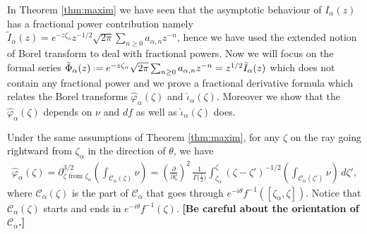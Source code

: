 \documentclass[11pt,a4paper,twoside,leqno,noamsfonts]{amsart}
\numberwithin{equation}{section}
\begin{document}
In Theorem \ref{thm:maxim} we have seen that the asymptotic behaviour of $I_\alpha(z)$ has a fractional power contribution namely $\tilde{I}_{\alpha}(z)=e^{-z\zeta_\alpha}z^{-1/2}\sqrt{2\pi}\sum_{n\geq 0}a_{\alpha,n}z^{-n}$, hence we have used the extended notion of Borel transform to deal with fractional powers. Now we will focus on the formal series $\tilde{\Phi}_\alpha(z)\defeq e^{-z\zeta_\alpha}\sqrt{2\pi}\sum_{n\geq 0}a_{\alpha,n}z^{-n}=z^{1/2}\tilde{I}_\alpha(z)$ which does not contain any fractional power and we prove a fractional derivative formula which relates the Borel transforms $\hat{\varphi}_\alpha(\zeta)$ and $\hat{\iota}_{\alpha}(\zeta)$. Moreover we show that the $\hat{\varphi}_{\alpha}(\zeta)$ depends on $\nu$ and $df$ as well as $\hat{\iota}_{\alpha}(\zeta)$ does. 

\begin{corollary}\label{int:deriv-formula} 
Under the same assumptions of Theorem \ref{thm:maxim}, for any $\zeta$ on the ray going rightward from $\zeta_\alpha$ in the direction of $\theta$, we have
\begin{multline}\label{formula1}
\hat{\varphi}_{\alpha}(\zeta)=\partial^{3/2}_{\zeta \text{ from }\zeta_\alpha} \left( \int_{\mathcal{C}_\alpha(\zeta)}\nu \right)={\left(\tfrac{\partial}{\partial \zeta}\right)^2}\,\frac{1}{\Gamma\big(\tfrac{1}{2}\big)} \int_{\zeta_\alpha}^\zeta (\zeta-\zeta')^{-1/2} {\left( \int_{\mathcal{C}_\alpha(\zeta')} \nu \right)}\,d\zeta',
\end{multline}
where $\mathcal{C}_\alpha(\zeta)$ is the part of $\mathcal{C}_\alpha$ that goes through $e^{-i\theta}f^{-1}([\zeta_\alpha, \zeta ])$. Notice that $\mathcal{C}_\alpha(\zeta)$ starts and ends in $e^{-i\theta}f^{-1}(\zeta)$. \textbf{[Be careful about the orientation of $\mathcal{C}_\alpha$.]}
\end{corollary}
\end{document}
